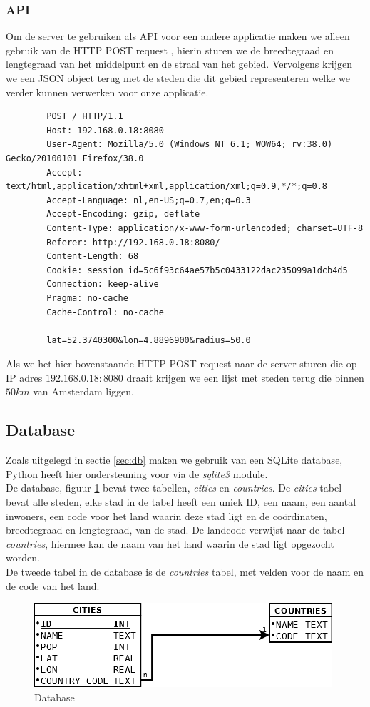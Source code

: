 \documentclass[twoside,openright]{uva-bachelor-thesis}
\begin{document}
		\subsubsection{API}
		Om de server te gebruiken als API voor een andere applicatie maken we alleen gebruik van de HTTP POST request \cite{HTTP}, hierin sturen we de breedtegraad en lengtegraad van het middelpunt en de straal van het gebied. Vervolgens krijgen we een JSON object terug met de steden die dit gebied representeren welke we verder kunnen verwerken voor onze applicatie.
		\begin{verbatim}
		POST / HTTP/1.1
		Host: 192.168.0.18:8080	
		User-Agent: Mozilla/5.0 (Windows NT 6.1; WOW64; rv:38.0) Gecko/20100101 Firefox/38.0
		Accept: text/html,application/xhtml+xml,application/xml;q=0.9,*/*;q=0.8
		Accept-Language: nl,en-US;q=0.7,en;q=0.3
		Accept-Encoding: gzip, deflate
		Content-Type: application/x-www-form-urlencoded; charset=UTF-8
		Referer: http://192.168.0.18:8080/
		Content-Length: 68
		Cookie: session_id=5c6f93c64ae57b5c0433122dac235099a1dcb4d5
		Connection: keep-alive
		Pragma: no-cache
		Cache-Control: no-cache
		
		lat=52.3740300&lon=4.8896900&radius=50.0
		\end{verbatim}
		Als we het hier bovenstaande HTTP POST request naar de server sturen die op IP adres $192.168.0.18:8080$ draait krijgen we een lijst met steden terug die binnen $50km$ van Amsterdam liggen.
		\subsection{Database}
			Zoals uitgelegd in sectie \ref{sec:db} maken we gebruik van een SQLite database, Python heeft hier ondersteuning voor via de \textit{sqlite3} \cite{sqlite3} module.\\[0.5cm]
			De database, figuur \ref{fig:db} bevat twee tabellen, \textit{cities} en \textit{countries}. De \textit{cities} tabel bevat alle steden, elke stad in de tabel heeft een uniek ID, een naam, een aantal inwoners, een code voor het land waarin deze stad ligt en de co\"ordinaten, breedtegraad en lengtegraad, van de stad. De landcode verwijst naar de tabel \textit{countries}, hiermee kan de naam van het land waarin de stad ligt opgezocht worden. \\[0.5cm]
			De tweede tabel in de database is de \textit{countries} tabel,  met velden voor de naam en de code van het land.
			\begin{figure}[!htb]
				\label{fig:db}
				\centering
				\includegraphics[scale=0.6]{./img/database.png}
				\caption{Database}
			\end{figure}
\end{document}
